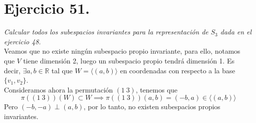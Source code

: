 \section{Ejercicio 51.} \emph{Calcular todos los subespacios invariantes para la representación de \(S_{3}\) dada en el ejercicio 48.}\\

Veamos que no existe ningún subespacio propio invariante, para ello, notamos que \(V\) tiene dimensión 2, luego un subespacio propio tendrá dimensión 1. Es decir, \(\exists a,b\in \mathbb{R}\) tal que \(W = \langle (a,b) \rangle\) en coordenadas con respecto a la base \(\{v_{1}, v_{2}\}\).\\

Consideramos ahora la permutación \((1 \ 3)\), tenemos que
\[
  \pi((1 \ 3))(W) \subset W \implies \pi((1 \ 3))(a, b) = (-b, a) \in \langle (a, b) \rangle
\]
Pero \((-b,-a)\perp (a,b)\), por lo tanto, no existen subespacios propios invariantes.
